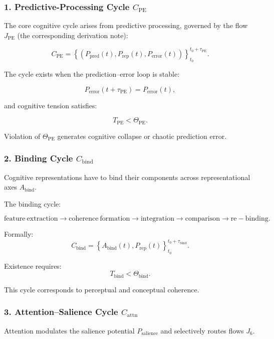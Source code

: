 \subsubsection{1. Predictive-Processing Cycle $C_{\mathrm{PE}}$}

The core cognitive cycle arises from predictive processing, governed by
the flow $J_{\mathrm{PE}}$ (the corresponding derivation note):

\[
 C_{\mathrm{PE}} =
 \left\{
   (P_{\mathrm{pred}}(t),
    P_{\mathrm{rep}}(t),
    P_{\mathrm{error}}(t))
 \right\}_{t_0}^{t_0+\tau_{\mathrm{PE}}}.
\]

The cycle exists when the prediction–error loop is stable:

\[
 P_{\mathrm{error}}(t+\tau_{\mathrm{PE}}) = P_{\mathrm{error}}(t),
\]

and cognitive tension satisfies:

\[
 T_{\mathrm{PE}} < \Theta_{\mathrm{PE}}.
\]

Violation of $\Theta_{\mathrm{PE}}$ generates cognitive collapse or chaotic
prediction error.

\subsubsection{2. Binding Cycle $C_{\mathrm{bind}}$}

Cognitive representations have to bind their components across
representational axes $A_{\mathrm{bind}}$.

The binding cycle:

\[
 \mathrm{feature\ extraction}
 \to
 \mathrm{coherence\ formation}
 \to
 \mathrm{integration}
 \to
 \mathrm{comparison}
 \to
 \mathrm{re-binding}.
\]

Formally:
\[
 C_{\mathrm{bind}} =
 \left\{
   A_{\mathrm{bind}}(t), P_{\mathrm{rep}}(t)
 \right\}_{t_0}^{t_0+\tau_{\mathrm{bind}}}.
\]

Existence requires:
\[
 T_{\mathrm{bind}} < \Theta_{\mathrm{bind}}.
\]

This cycle corresponds to perceptual and conceptual coherence.

\subsubsection{3. Attention–Salience Cycle $C_{\mathrm{attn}}$}

Attention modulates the salience potential $P_{\mathrm{salience}}$ and
selectively routes flows $J_6$.


